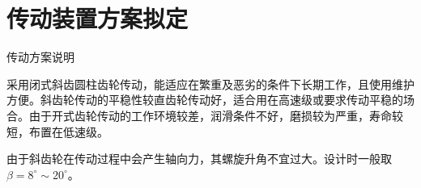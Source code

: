 \section{传动装置方案拟定}

传动方案说明

采用闭式斜齿圆柱齿轮传动，能适应在繁重及恶劣的条件下长期工作，且使用维护方便。斜齿轮传动的平稳性较直齿轮传动好，适合用在高速级或要求传动平稳的场合。由于开式齿轮传动的工作环境较差，润滑条件不好，磨损较为严重，寿命较短，布置在低速级。

由于斜齿轮在传动过程中会产生轴向力，其螺旋升角不宜过大。设计时一般取$\beta =8^\circ\sim 20^\circ$。